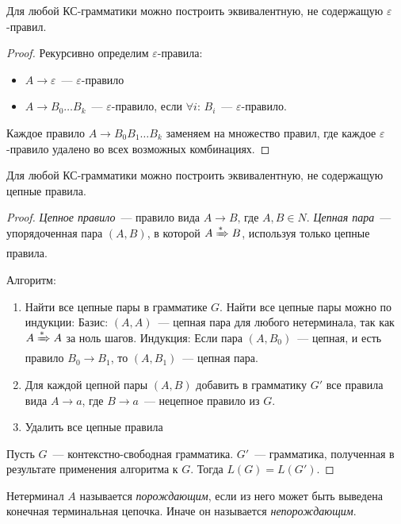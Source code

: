 \begin{lemma}
    Для любой КС-грамматики можно построить эквивалентную, не содержащую $\varepsilon$-правил.
\end{lemma}

\begin{proof}
    Рекурсивно определим $\varepsilon$-правила:
    \begin{itemize}
        \item $A \to \varepsilon$~--- $\varepsilon$-правило
        \item $A \to B_0 \dots B_k$~--- $\varepsilon$-правило, если $\forall i$: $B_i$~--- $\varepsilon$-правило.
    \end{itemize}
    Каждое правило $A \to B_0 B_1 \dots B_k$ заменяем на множество правил, где каждое $\varepsilon$-правило удалено во всех возможных комбинациях.
\end{proof}

\begin{lemma}
    Для любой КС-грамматики можно построить эквивалентную, не содержащую цепные правила.
\end{lemma}

\begin{proof}
    \emph{Цепное правило}~--- правило вида $A \to B\text{, где } A, B \in N$.
    \emph{Цепная пара}~--- упорядоченная пара $(A,B)$, в которой $A\derives B$, используя только цепные правила.

    Алгоритм:
    \begin{enumerate}
        \item Найти все цепные пары в грамматике $G$.
              Найти все цепные пары можно по индукции:
              Базис: $(A,A)$~--- цепная пара для любого нетерминала, так как $A\derives A$ за ноль шагов.
              Индукция: Если пара $(A,B_0)$~--- цепная, и есть правило $B_0 \to B_1$, то $(A,B_1)$~--- цепная пара.
        \item Для каждой цепной пары $(A,B)$ добавить в грамматику $G'$ все правила вида $A \to a$, где $B \to a$~--- нецепное правило из $G$.
        \item Удалить все цепные правила
    \end{enumerate}
    Пусть $G$~--- контекстно-свободная грамматика. $G'$~--- грамматика, полученная в результате применения алгоритма к $G$. Тогда $L(G)=L(G')$.
\end{proof}

\begin{definition}
    Нетерминал $A$ называется \emph{порождающим}, если из него может быть выведена конечная терминальная цепочка.
    Иначе он называется \emph{непорождающим}.
\end{definition}

